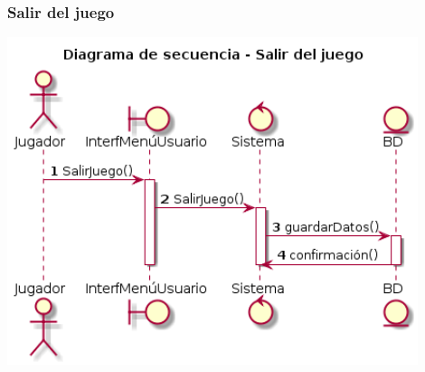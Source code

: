 \subsubsection{Salir del juego}
  \includegraphics[width=0.9\textwidth]{./imatges/jugador/Salir_del_juego.png}

